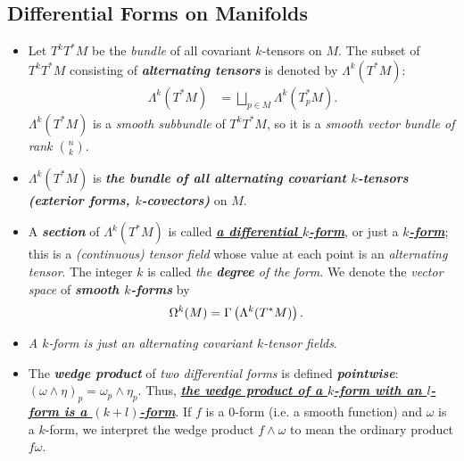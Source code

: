 \documentclass[11pt]{article}
\begin{document}
\subsection{Differential Forms on Manifolds}
\begin{itemize}
\item \begin{definition} 
Let $T^kT^{*}M$ be the \emph{bundle} of all covariant $k$-tensors on $M$. The subset of $T^kT^{*}M$ consisting of \emph{\textbf{alternating tensors}} is denoted by $\Lambda^k(T^{*}M)$:
\begin{align*}
\Lambda^k(T^{*}M) &= \bigsqcup_{p\in M}\Lambda^k(T_{p}^{*}M).
\end{align*}  $\Lambda^k(T^{*}M)$ is a \emph{smooth subbundle} of $T^{k}T^{*}M$, so it is a \emph{smooth vector bundle of rank $n \choose k$}.
\end{definition}

\item \begin{remark}
$\Lambda^k(T^{*}M)$ is \emph{\textbf{the bundle of all alternating covariant $k$-tensors (exterior forms, $k$-covectors)}} on $M$.  
\end{remark}

\item \begin{definition}
A \emph{\textbf{section}} of $\Lambda^k(T^{*}M)$ is called \underline{\emph{\textbf{a differential $k$-form}}}, or just a \underline{\emph{\textbf{$k$-form}}}; this is
a \emph{(continuous) tensor field} whose value at each point is an \emph{alternating tensor}. The integer $k$ is called \emph{the \textbf{degree} of the form}. We denote the \emph{vector space} of \emph{\textbf{smooth $k$-forms}} by
\begin{align*}
\Omega^{k}(M) &= \Gamma\left(\Lambda^k(T^{*}M)\right).
\end{align*}
\end{definition}

\item \begin{remark}
\textit{A $k$-form is just an alternating covariant $k$-tensor fields}. 
\end{remark}

\item \begin{remark}
The \emph{\textbf{wedge product}} of \emph{two differential forms} is defined \emph{\textbf{pointwise}}: $(\omega \wedge \eta)_p = \omega_p \wedge \eta_p$. Thus, \underline{\emph{\textbf{the wedge product of a $k$-form with an $l$-form is a $(k +l)$-form}}}. If $f$ is a $0$-form (i.e. a smooth function) and $\omega$ is a $k$-form, we interpret the wedge product  $f\wedge \omega$ to mean the ordinary product $f\omega$.
\end{remark}


\end{itemize}
\end{document}
